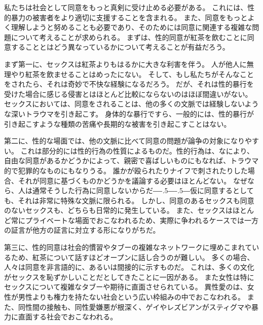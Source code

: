 \documentclass[paper=a4,book,openany]{jlreq}
\def\DDASH{―\kern-.5\zw―\kern-.5\zw―} %
\begin{document}
私たちは社会として同意をもっと真剣に受け止める必要がある。
これには、性的暴力の被害者をより適切に支援することを含まれる。
また、同意をもっとよく理解しようと努めることも必要であり、そのためには同意に関連する複雑な問題について考えることが求められる。
まずは、性的同意が紅茶を飲むことに同意することとはどう異なっているかについて考えることが有益だろう。

まず第一に、セックスは紅茶よりもはるかに大きな利害を伴う。
人が他人に無理やり紅茶を飲ませることはめったにない。
そして、もし私たちがそんなことをされたら、それは奇妙で不快な経験になるだろう。
だが、それは性的暴行を受けた場合に感じる侵害とはほとんど比較にならないのはほぼ間違いがない。
セックスにおいては、同意をされることは、他の多くの文脈では経験しないような深いトラウマを引き起こす。
身体的な暴行ですら、一般的には、性的暴行が引き起こすような種類の苦痛や長期的な被害を引き起こすことはない。

第二に、性的な場面では、他の文脈に比べて同意の問題が論争の対象になりやすい。
これは部分的には性的行為の性質によるものだ。性的行為は、なにより、自由な同意があるかどうかによって、親密で喜ばしいものにもなれば、トラウマ的で犯罪的なものにもなりうる。
誰かが殴られたりナイフで刺されたりした場合、それが同意に基づくものかどうかを議論する必要はほとんどない。
なぜなら、人は通常そうした行為に同意しないからだ{\DDASH}仮に同意するとしても、それは非常に特殊な文脈に限られる。
しかし、同意のあるセックスも同意のないセックスも、どちらも日常的に発生している。
また、セックスはほとんど常にプライベートな場面でおこなわれるため、実際に争われるケースでは一方の証言が他方の証言に対立する形になりがちだ。

第三に、性的同意は社会的慣習やタブーの複雑なネットワークに埋めこまれているため、紅茶について話すほどオープンに話し合うのが難しい。
多くの場合、人々は同意を非言語的に、あるいは間接的に示すものだ。
これは、多くの文化がセックスを恥ずかしいことだとしてきたことに一因がある。
また女性は特にセックスについて複雑なタブーや期待に直面させられている。
異性愛のは、女性が男性よりも権力を持たない社会という広い枠組みの中でおこなわれる。
また、同性間の接触も、同性愛嫌悪が根深く、ゲイやレズビアンがスティグマや暴力に直面する社会でおこなわれる。
\end{document}

